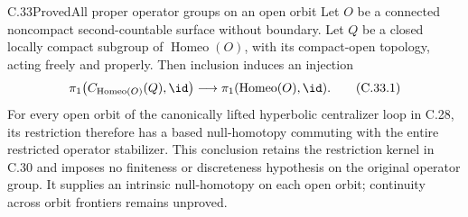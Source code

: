 \begin{claim}{C.33}{Proved}{All proper operator groups on an open orbit}
Let $O$ be a connected noncompact second-countable surface without
boundary. Let $Q$ be a closed locally compact subgroup of
$\operatorname{Homeo}(O)$, with its compact-open topology, acting
freely and properly. Then inclusion induces an injection
\[
 \pi_1\!\left(C_{\operatorname{Homeo}(O)}(Q),\id\right)
       \longrightarrow \pi_1(\operatorname{Homeo}(O),\id).
                                                        \tag{C.33.1}
\]
For every open orbit of the canonically lifted hyperbolic
centralizer loop in C.28, its restriction therefore has a based
null-homotopy commuting with the entire restricted operator
stabilizer. This conclusion retains the restriction kernel in
C.30 and imposes no finiteness or discreteness hypothesis on the
original operator group.
It supplies an intrinsic null-homotopy on each open orbit;
continuity across orbit frontiers remains unproved.
\end{claim}

